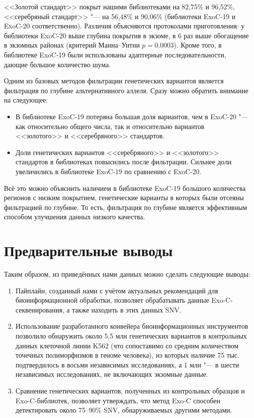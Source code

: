 \documentclass[a4paper,12pt]{article}
\begin{document}
<<Золотой стандарт>> покрыт нашими библиотеками на 82,75\% и 96,52\%, <<серебряный стандарт>> "--- на 56,48\% и 90,06\% (библиотеки ExoC-19 и ExoC-20 соответственно).
Различия объясняются протоколами приготовления: у библиотеки ExoC-20 выше глубина покрытия в экзоме, в 6 раз выше обогащение в экзомных районах (критерий Манна--Уитни $p = 0.0003$).
Кроме того, в библиотеке ExoC-19 были использованы адаптерные последовательности, дающие большое количество шума.

Одним из базовых методов фильтрации генетических вариантов является фильтрация по глубине альтернативного аллеля.
Сразу можно обратить внимание на следующее:

\begin{itemize}
\item В библиотеке ExoC-19 потеряна большая доля вариантов, чем в ExoC-20 "--- как относительно общего числа, так и относительно вариантов <<золотого>> и <<серебряного>> стандартов.
\item Доли генетических вариантов <<серебряного>> и <<золотого>> стандартов в библиотеках повысились после фильтрации.
Сильнее доли увеличились в библиотеке ExoC-19 по сравнению с ExoC-20.
\end{itemize}

Всё это можно объяснить наличием в библиотеке ExoC-19 большого количества регионов с низким покрытием, генетические варианты в которых были отсеяны фильтрацией по глубине.
То есть, фильтрация по глубине является эффективным способом улучшения данных низкого качества.

\section{Предварительные выводы}

Таким образом, из приведённых нами данных можно сделать следующие выводы:

\begin{enumerate}
\item Пайплайн, созданный нами с учётом актуальных рекомендаций для биоинформационной обработки, позволяет обрабатывать данные Exo-C-секвенирования, а также находить в этих данных SNV.
\item Использование разработанного конвейера биоинформационных инструментов позволило обнаружить около 5,5 млн генетических вариантов в контрольных данных клеточной линии K562 (что сопоставимо со средним количеством точечных полиморфизмов в геноме человека), из которых наличие 75 тыс. подтвердилось в восьми независимых исследованиях, а 1 млн "--- в шести независимых исследованиях, не включающих экзомные данные.
\item Сравнение генетических вариантов, полученных из контрольных образцов и Exo-C-библиотек, позволяет утверждать, что метод Exo-C способен детектировать около 75--90\% SNV, обнаруживаемых другими методами.
\end{enumerate}
\end{document}

